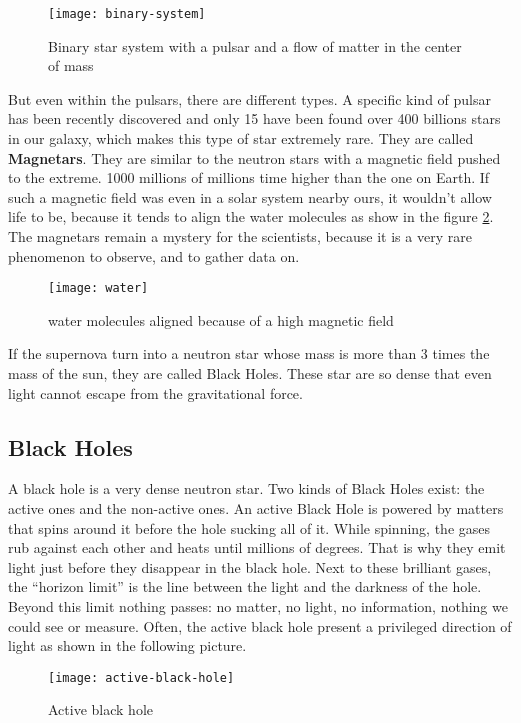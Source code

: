 \documentclass[a4paper, 11pt]{article} %
\begin{document}
                          
\begin{figure}[h]
\centering
\texttt{[image: binary-system]}
\caption{Binary star system with a pulsar and a flow of matter in the center of mass}
\label{bin}
\end{figure}
\newpage
                            
But even within the pulsars, there are different types. A specific kind of pulsar has been recently discovered and only 15 have been found over 400 billions stars in our galaxy, which makes this type of star extremely rare. They are called \textbf{Magnetars}. They are similar to the neutron stars with a magnetic field pushed to the extreme. 1000 millions of millions time higher than the one on Earth. If such a magnetic field was even in a solar system nearby ours, it wouldn't allow life to be, because it tends to align the water molecules as show in the figure \ref{water}. The magnetars remain a mystery for the scientists, because it is a very rare phenomenon to observe, and to gather data on.


\begin{figure}[h]
\centering
\texttt{[image: water]}
\caption{water molecules aligned because of a high magnetic field}
\label{water}
\end{figure}

If the supernova turn into a neutron star whose mass is more than 3 times the mass of the sun, they are called Black Holes. These star are so dense that even light cannot escape from the gravitational force. 

\subsection{Black Holes}
A black hole is a very dense neutron star. Two kinds of Black Holes exist: the active ones and the non-active ones. An active Black Hole is powered by matters that spins around it before the hole sucking all of it. While spinning, the gases rub against each other and heats until millions of degrees. That is why they emit light just before they disappear in the black hole. Next to these brilliant gases, the “horizon limit” is the line between the light and the darkness of the hole. Beyond this limit nothing passes: no matter, no light, no information, nothing we could see or measure. Often, the active black hole present a privileged direction of light as shown in the following picture.

\begin{figure}[h]
\centering
\texttt{[image: active-black-hole]}
\caption{Active black hole}
\end{figure}
\end{document}
